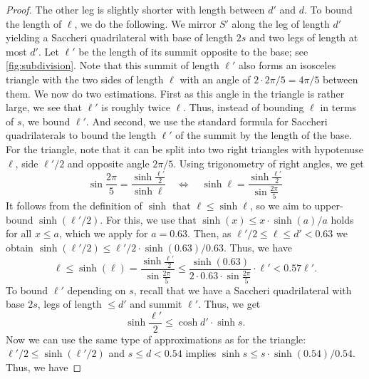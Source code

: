 \begin{proof}
    The other leg is slightly shorter with length between $d'$ and $d$.
    To bound the length of $\ell$, we do the following.
    We mirror $S'$ along the leg of length $d'$ yielding a Saccheri quadrilateral with base of length $2s$ and two legs of length at most $d'$.
    Let $\ell'$ be the length of its summit opposite to the base; see \cref{fig:subdivision}.
    Note that this summit of length $\ell'$ also forms an isosceles triangle with the two sides of length $\ell$ with an angle of $2 \cdot 2\pi / 5 = 4 \pi / 5$ between them.
    We now do two estimations.
    First as this angle in the triangle is rather large, we see that $\ell'$ is roughly twice $\ell$.
    Thus, instead of bounding $\ell$ in terms of $s$, we bound $\ell'$.
    And second, we use the standard formula for Saccheri quadrilaterals to bound the length $\ell'$ of the summit by the length of the base.
%
    For the triangle, note that it can be split into two right triangles with hypotenuse $\ell$, side $\ell'/2$ and opposite angle $2\pi / 5$.
    Using trigonometry of right angles, we get
    \begin{equation*}
        \sin \frac{2 \pi}{5} = \frac{\sinh \frac{\ell'}{2} }{\sinh \ell}
        \quad \iff \quad
        \sinh \ell = \frac{\sinh \frac{\ell'}{2} }{\sin \frac{2 \pi}{5}}
    \end{equation*}
    It follows from the definition of $\sinh$ that $\ell \le \sinh \ell$, so we aim to upper-bound $ \sinh(\ell'/2) $.
    For this, we use that $ \sinh(x) \leq x \cdot \sinh(a) / a $  holds for all $ x \leq a $, which we apply for $ a = 0.63 $.
    Then, as $\ell' / 2 \le \ell \le d' < 0.63$ we obtain $\sinh(\ell' / 2) \le \ell' / 2 \cdot \sinh(0.63) / 0.63$.  Thus, we have
    \begin{equation*}
        \ell \le
        \sinh(\ell) =
        \frac{\sinh \frac{\ell'}{2} }{\sin \frac{2 \pi}{5}} \le
        \frac{\sinh (0.63)}{2 \cdot 0.63 \cdot \sin \frac{2 \pi}{5}} \cdot \ell'
        < 0.57 \ell'.
    \end{equation*}
%
    To bound $\ell'$ depending on $s$, recall that we have a Saccheri quadrilateral with base $2s$, legs of length $\le d'$ and summit $\ell'$.
    Thus, we get
    \begin{equation*}
        \sinh \frac{\ell'}{2} \le \cosh d' \cdot \sinh s.
    \end{equation*}
    Now we can use the same type of approximations as for the triangle: $\ell' / 2 \le \sinh(\ell' / 2)$ and $s \le d < 0.54$ implies $\sinh s \le s \cdot \sinh(0.54) / 0.54$.  Thus, we have 

\end{proof}

